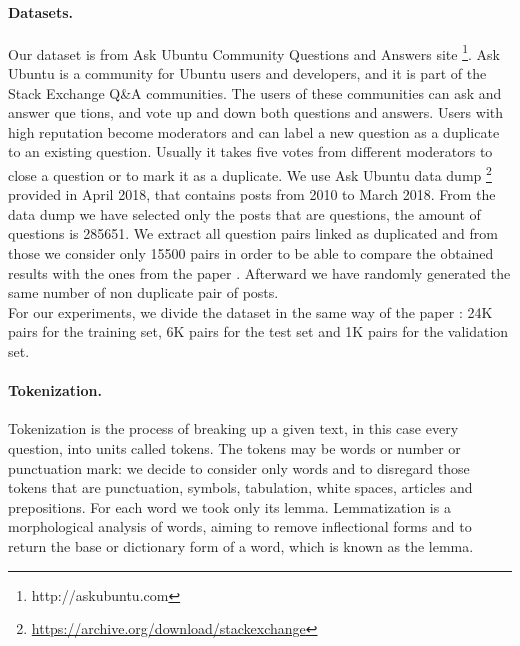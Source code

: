 \documentclass[10pt,twocolumn,letterpaper]{article}
\begin{document}
\paragraph{Datasets.}
Our dataset is from Ask Ubuntu Community Questions and Answers site \footnote{http://askubuntu.com}. Ask Ubuntu is a community for Ubuntu users and developers, and it is part of the Stack Exchange Q\&A communities. The users of these communities can ask and answer que tions, and vote up and down both questions and answers. Users with high reputation become moderators and can label a new question as a duplicate to an existing question. Usually it takes five votes from different moderators to close a question or to mark it as a duplicate. 
We use Ask Ubuntu data dump \footnote{ \url{https://archive.org/download/stackexchange}} provided in April 2018, that contains posts from 2010 to March 2018. From the data dump we have selected only the posts that are questions, the amount of questions is 285651. We extract all question pairs linked as duplicated and from those we consider only 15500 pairs in order to be able to compare the obtained results with the ones from the paper \cite{bogdanova2015detecting}. Afterward we have randomly generated the same number of non duplicate pair of posts. \\
For our experiments, we divide the dataset in the same way of the paper \cite{bogdanova2015detecting}: 24K pairs for the training set, 6K pairs for the test set and 1K pairs for the validation set.

\paragraph{Tokenization.}
Tokenization is the process of breaking up a given text, in this case every question, into units called tokens. The tokens may be words or number or punctuation mark: we decide to consider only words and to disregard those tokens that are punctuation, symbols, tabulation, white spaces, articles and prepositions.
For each word we took only its lemma. Lemmatization is a morphological analysis of words, aiming to remove inflectional forms and to return the base or dictionary form of a word, which is known as the lemma.
\end{document}
